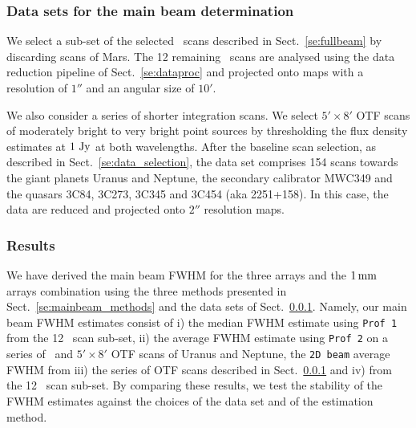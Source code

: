 \subsubsection{Data sets for the main beam determination}
\label{se:mainbeam_dataset}

We select a sub-set of the selected \bm\ scans described in
Sect.~\ref{se:fullbeam} by discarding scans of Mars.
The 12 remaining \bm\ scans are analysed using the data reduction
pipeline of Sect.~\ref{se:dataproc} and projected onto maps
with a resolution of $1''$ and an angular size of $10'$.

We also consider a series of shorter integration scans. We select
$5' \times 8'$ OTF scans of moderately bright to very bright point sources by
thresholding the flux density estimates at $1~\rm{Jy}$ at both
wavelengths. %
After the baseline scan selection, as described in
Sect.~\ref{se:data_selection}, the data set comprises 154 %
scans towards the giant planets Uranus and Neptune, the secondary calibrator
MWC349 and the quasars 3C84, 3C273, 3C345 and 3C454 (aka
2251+158). In this case, the data are reduced and projected onto $2''$
resolution maps. 

\subsubsection{Results}
\label{se:mainbeam_results}

We have derived the main beam FWHM for the three arrays and the
$1\,\rm{mm}$ arrays combination using the three methods presented in
Sect.~\ref{se:mainbeam_methods} and the data
sets of Sect.~\ref{se:mainbeam_dataset}.
Namely, our main beam FWHM estimates
consist of i) the median FWHM estimate using {\tt Prof 1} from the 12 \bm\ scan
sub-set, ii) the average FWHM estimate using {\tt Prof 2} on a series
of \bm\ and $5' \times 8'$ OTF scans of Uranus and Neptune, the {\tt 2D beam} average FWHM
from iii) the series of OTF scans described in
Sect.~\ref{se:mainbeam_dataset} and iv) from the 12 \bm\ scan
sub-set. By comparing these results, we test the stability of the FWHM
estimates against the choices of the data set and of the estimation
method. %

